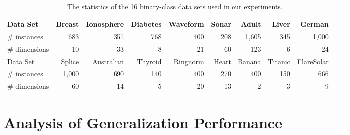 \begin{table}[!htb] \label{table:dataset-dmkl}
\centering\caption{The statistics of the 16 binary-class data sets used in our experiments.}
\begin{center}
\begin{footnotesize}
\begin{tabular}{l|rrrrrrrrrr}
\hline
Data Set    &Breast &Ionosphere &Diabetes   &Waveform  &Sonar &Adult  &Liver  &German\\
\hline
\hline
\# instances      &683  &351  &768    &400    &208    &1,605  &345    &1,000 \\
\# dimensions &10   &33   &8  &21 &60 &123    &6  &24\\
\hline
\hline
Data Set    &Splice &Australian  &Thyroid &Ringnorm &Heart    &Banana   &Titanic  &FlareSolar\\
\hline
\hline
\# instances      &1,000  &690    &140    &400    &270    &400    &150    &666   \\
\# dimensions   &60   &14 &5  &20 &13 &2  &3  &9    \\
\hline
\end{tabular}
\end{footnotesize}
\end{center}
\end{table}


\section{Analysis of Generalization Performance}
\def\v{{\varepsilon}}

